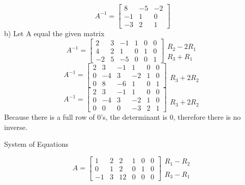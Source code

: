 \documentclass[12pt]{article}
\newcommand{\sqbrl}{\left[}
\newcommand{\sqbrr}{\right]}
\newenvironment{problem}[2][Problem]{\begin{trivlist}
\item[\hskip \labelsep {\bfseries #1}\hskip \labelsep {\bfseries #2.}]}{\end{trivlist}}
\begin{document}
\[A^{-1} = \sqbrl\begin{matrix}8 & -5 & -2\\-1 & 1 & 0\\-3 & 2 & 1\end{matrix}\sqbrr\]
b) Let A equal the given matrix\\
\[A^{-1} = \sqbrl\begin{array}{ccc|ccc}
2 & 3 & -1 & 1 & 0 & 0\\
4 & 2 & 1 & 0 & 1 & 0 \\
-2 & 5 & -5 & 0 & 0 & 1
\end{array}\sqbrr\begin{matrix}\\R_2 - 2R_1\\R_3 + R_1\end{matrix}\]
\[A^{-1} = \sqbrl\begin{array}{ccc|ccc}
2 & 3 & -1 & 1 & 0 & 0\\
0 & -4 & 3 & -2 & 1 & 0 \\
0 & 8 & -6 & 1 & 0 & 1
\end{array}\sqbrr\begin{matrix}\\\\R_3 + 2R_2\end{matrix}\]
\[A^{-1} = \sqbrl\begin{array}{ccc|ccc}
2 & 3 & -1 & 1 & 0 & 0\\
0 & -4 & 3 & -2 & 1 & 0 \\
0 & 0 & 0 & -3 & 2 & 1
\end{array}\sqbrr\begin{matrix}\\\\R_3 + 2R_2\end{matrix}\]
Because there is a full row of 0's, the determinant is 0, therefore there is no inverse.

\begin{problem}{2}
	System of Equations
\end{problem}
\[A = \sqbrl\begin{array}{ccc|ccc}
1 & 2 & 2 & 1 & 0 & 0\\
0 & 1 & 2 & 0 & 1 & 0\\
 -1 & 3 & 12 & 0 & 0 & 0\end{array}\sqbrr
\begin{matrix}R_1 - R_2\\\\R_3 - R_1\end{matrix}\]
\end{document}
